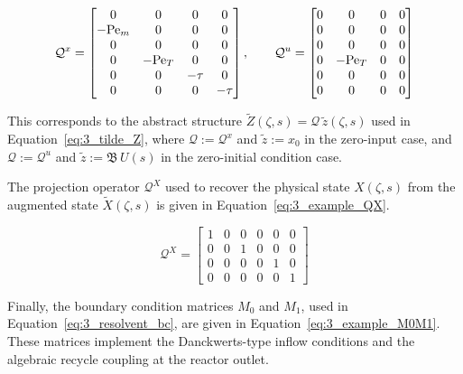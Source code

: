 \begin{equation} \label{eq:3_example_Qx_Qu}
\mathcal{Q}^x =
\begin{bmatrix}
0 & 0 & 0 & 0 \\
-{\rm Pe}_m & 0 & 0 & 0 \\
0 & 0 & 0 & 0 \\
0 & -{\rm Pe}_T & 0 & 0 \\
0 & 0 & -\tau & 0 \\
0 & 0 & 0 & -\tau
\end{bmatrix}, \qquad
\mathcal{Q}^u =
\begin{bmatrix}
0 & 0 & 0 & 0 \\
0 & 0 & 0 & 0 \\
0 & 0 & 0 & 0 \\
0 & -{\rm Pe}_T & 0 & 0 \\
0 & 0 & 0 & 0 \\
0 & 0 & 0 & 0
\end{bmatrix}
\end{equation}

This corresponds to the abstract structure $\tilde{Z}(\zeta, s) = \mathcal{Q}\, \tilde{z}(\zeta, s)$ used in Equation~\ref{eq:3_tilde_Z}, where $\mathcal{Q} := \mathcal{Q}^x$ and $\tilde{z} := x_0$ in the zero-input case, and $\mathcal{Q} := \mathcal{Q}^u$ and $\tilde{z} := \mathfrak{B}\, U(s)$ in the zero-initial condition case.

The projection operator $\mathcal{Q}^X$ used to recover the physical state $X(\zeta, s)$ from the augmented state $\tilde{X}(\zeta, s)$ is given in Equation~\eqref{eq:3_example_QX}.

\begin{equation} \label{eq:3_example_QX}
\mathcal{Q}^X =
\begin{bmatrix}
1 & 0 & 0 & 0 & 0 & 0 \\
0 & 0 & 1 & 0 & 0 & 0 \\
0 & 0 & 0 & 0 & 1 & 0 \\
0 & 0 & 0 & 0 & 0 & 1
\end{bmatrix}
\end{equation}

Finally, the boundary condition matrices $M_0$ and $M_1$, used in Equation~\eqref{eq:3_resolvent_bc}, are given in Equation~\eqref{eq:3_example_M0M1}. These matrices implement the Danckwerts-type inflow conditions and the algebraic recycle coupling at the reactor outlet.

